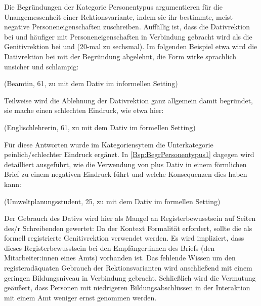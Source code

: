 Die Begründungen der Kategorie \glqq Personentypus\grqq{} argumentieren für die Unangemessenheit einer Rektionsvariante, indem sie ihr bestimmte, meist negative Personeneigenschaften zuschreiben. 
Auffällig ist, dass die Dativrektion bei \wegen{} und \waehrend{} häufiger mit Personeneigenschaften in Verbindung gebracht wird als die Genitivrektion bei \dank{} und \gegenueber{} (20-mal zu sechsmal).
Im folgenden Beispiel etwa wird die Dativrektion bei \waehrend{} mit der Begründung abgelehnt, die Form wirke sprachlich unsicher und schlampig:
\begin{exe}
\ex {} (Beamtin, 61, zu \waehrend{} mit dem Dativ im informellen Setting)
\end{exe}
Teilweise wird die Ablehnung der Dativrektion ganz allgemein damit begründet, sie mache einen schlechten Eindruck, wie etwa hier:
\begin{exe}
\ex {} (Englischlehrerin, 61, zu \wegen{} mit dem Dativ im formellen Setting)
\end{exe}
Für diese Antworten wurde im Kategoriensytem die Unterkategorie \glqq peinlich/schlechter Eindruck\grqq{} ergänzt. 
In \autoref{Bsp:BegrPersonentypus1} dagegen wird detailliert ausgeführt, wie die Verwendung von \waehrend{} plus Dativ in einem förmlichen Brief zu einem negativen Eindruck führt und welche Konsequenzen dies haben kann:
\begin{exe}
\ex {} (Umweltplanungsstudent, 25, zu \waehrend{} mit dem Dativ im formellen Setting) \label{Bsp:BegrPersonentypus1}
\end{exe}
Der Gebrauch des Dativs wird hier als Mangel an Registerbewusstsein auf Seiten des/r Schreibenden gewertet: 
Da der Kontext Formalität erfordert, sollte die als formell registrierte Genitivrektion verwendet werden. 
Es wird impliziert, dass dieses Registerbewusstsein bei den Empfänger:innen des Briefs (den Mitarbeiter:innen eines Amts) vorhanden ist. 
Das fehlende Wissen um den registeradäquaten Gebrauch der Rektionsvarianten wird anschließend mit einem geringen Bildungsniveau in Verbindung gebracht. 
Schließlich wird die Vermutung geäußert, dass Personen mit niedrigeren Bildungsabschlüssen in der Interaktion mit einem Amt weniger ernst genommen werden. 


